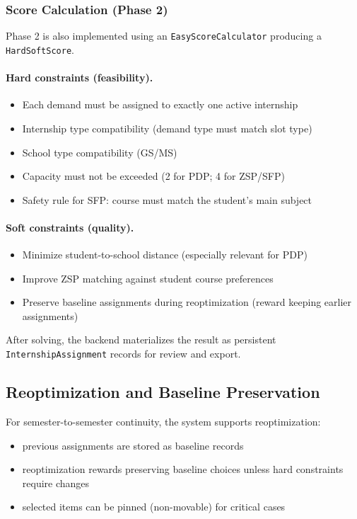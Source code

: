 \documentclass[12pt,a4paper]{report}
\begin{document}
\subsubsection*{Score Calculation (Phase 2)}

Phase 2 is also implemented using an \texttt{EasyScoreCalculator} producing a \texttt{HardSoftScore}.

\paragraph{Hard constraints (feasibility).}
\begin{itemize}
    \item Each demand must be assigned to exactly one active internship
    \item Internship type compatibility (demand type must match slot type)
    \item School type compatibility (GS/MS)
    \item Capacity must not be exceeded (2 for PDP; 4 for ZSP/SFP)
    \item Safety rule for SFP: course must match the student's main subject
\end{itemize}

\paragraph{Soft constraints (quality).}
\begin{itemize}
    \item Minimize student-to-school distance (especially relevant for PDP)
    \item Improve ZSP matching against student course preferences
    \item Preserve baseline assignments during reoptimization (reward keeping earlier assignments)
\end{itemize}

After solving, the backend materializes the result as persistent \texttt{InternshipAssignment} records for review and export.

\subsection{Reoptimization and Baseline Preservation}

For semester-to-semester continuity, the system supports reoptimization:

\begin{itemize}
    \item previous assignments are stored as baseline records
    \item reoptimization rewards preserving baseline choices unless hard constraints require changes
    \item selected items can be pinned (non-movable) for critical cases
\end{itemize}
\end{document}
